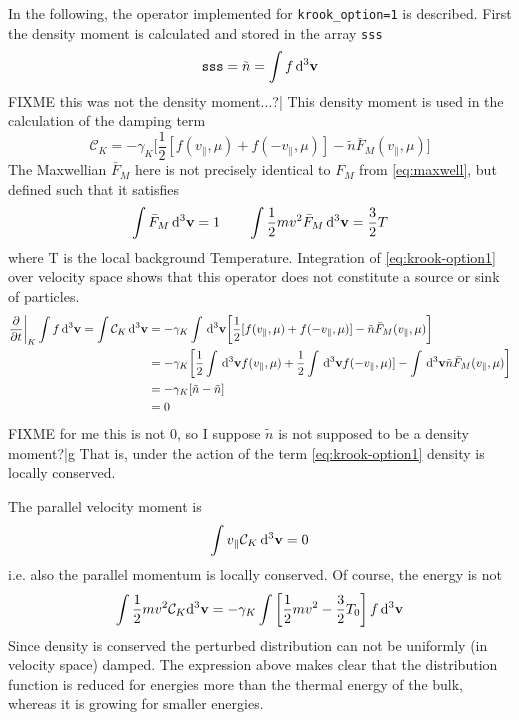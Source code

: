 In the following, the operator implemented for \texttt{krook_option=1} is described. 
First the density moment is calculated and stored in the array \texttt{sss} 
\begin{equation}
\mathtt{sss}  = \tilde n = \int f \, {\rm d}^3 {\bf v}
\end{equation}
FIXME this was not the density moment...?|
This density moment is used in the calculation of the damping term 
\begin{equation}
\mathcal{C}_K
= - \gamma_K \biggl [   
\frac{1 }{ 2} [ f(v_\parallel,\mu) + f(-v_\parallel,\mu)] -  \tilde n \bar F_M(v_\parallel,\mu) \biggr ] 
\label{eq:krook-option1}
\end{equation}
The Maxwellian $\bar F_M$ here is not precisely identical to $F_M$ from \eqref{eq:maxwell}, but defined such that it satisfies 
\begin{equation}
\int \bar F_M \, {\rm d}^3 {\bf v} = 1 \qquad \int \frac{1}{ 2} m v^2 \bar F_M \, {\rm d}^3 {\bf v} = \frac{3 }{ 2} T 
\end{equation}
where T is the local background Temperature. 
Integration of \eqref{eq:krook-option1} over velocity space shows that this operator does not constitute a source or sink of particles.
\begin{align}
\frac{\partial }{\partial  t} \biggr \vert_{K} \int f \, {\rm d}^3 {\bf v} =
 \int \mathcal{C}_K \, {\rm d}^3 {\bf v}
 &=   - \gamma_K\int \, {\rm d}^3 {\bf v}  \biggl [   
\frac{1 }{ 2}[f(v_\parallel,\mu) + f(-v_\parallel,\mu)] -  \tilde n \bar F_M(v_\parallel,\mu) \biggr ] 
\nonumber\\
&=   - \gamma_K\biggl [   
\frac{1 }{ 2}\int \, {\rm d}^3 {\bf v}   f(v_\parallel,\mu) 
+\frac{1 }{ 2} \int \, {\rm d}^3 {\bf v}  f(-v_\parallel,\mu)] 
-  \int \, {\rm d}^3 {\bf v}  \tilde n \bar F_M(v_\parallel,\mu) \biggr ] 
\nonumber\\
&=   - \gamma_K [ \tilde n  - \tilde n] 
\nonumber\\
&= 0
\end{align}
FIXME for me this is not 0, so I suppose $\tilde n$ is not supposed to be a density moment?|g
That is, under the action of the term \eqref{eq:krook-option1} density is locally conserved. 

The parallel velocity moment is
\begin{equation}
\int v_\parallel \mathcal{C}_K \, {\rm d}^3 {\bf v} = 0 
\end{equation}
i.e. also the parallel momentum is locally conserved. Of course, the energy is not 
\begin{equation}
\int \frac{1 }{ 2 } m v^2 \mathcal{C}_K {\rm d}^3 {\bf v}  = 
- \gamma_K \int \left [ \frac{1 }{ 2} m v^2 - \frac{3 }{ 2} T_0 \right ] f \, {\rm d}^3 {\bf v} 
\end{equation}
Since density is conserved the perturbed distribution can not be uniformly (in velocity space) damped. 
The expression above makes clear that the distribution function is reduced for energies more than the 
thermal energy of the bulk, whereas it is growing for smaller energies. 


